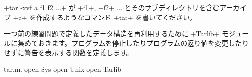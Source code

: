 \begin{exercise}
\label{ex/maketar}
\ml+tar -xvf a f1 f2 ...+ が \ml+f1+, \ml+f2+ ... とそのサブディレクトリを含むアーカイブ \ml+a+ を作成するようなコマンド \ml+tar+ を書いてください。
\end{exercise}
\begin{answer}
一つ前の練習問題で定義したデータ構造を再利用するために \ml+Tarlib+ モジュールに集めておきます。プログラムを停止したりプログラムの返り値を変更したりせずに警告を表示する関数を定義します。
%
\begin{listingcodefile}{tar.ml}
open Sys
open Unix
open Tarlib


\end{listingcodefile}
\end{answer}
